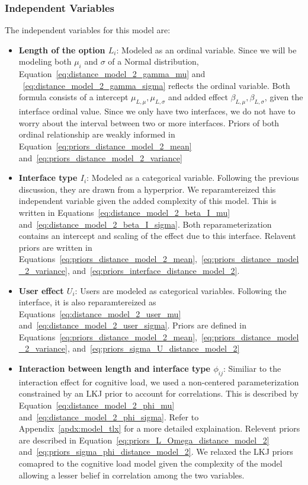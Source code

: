 \subsubsection{Independent Variables}
The independent variables for this model are:
\begin{itemize}
    \item \textbf{Length of the option $L_i$}: Modeled as an ordinal variable. Since we will be modeling both $\mu_i$ and $\sigma$ of a Normal distribution, Equation~\ref{eq:distance_model_2_gamma_mu} and ~\ref{eq:distance_model_2_gamma_sigma} reflects the ordinal variable. Both formula consists of a intercept $\mu_{L,\mu}, \mu_{L,\sigma}$ and added effect $\beta_{L,\mu}, \beta_{L,\sigma}$, given the interface ordinal value. Since we only have two interfaces, we do not have to worry about the interval between two or more interfaces. Priors of both ordinal relationship are weakly informed in Equation~\ref{eq:priors_distance_model_2_mean} and~\ref{eq:priors_distance_model_2_variance}
    \item \textbf{Interface type $I_i$}: Modeled as a categorical variable. Following the previous discussion, they are drawn from a hyperprior. We reparamtereized this independent variable given the added complexity of this model. This is written in Equations~\ref{eq:distance_model_2_beta_I_mu} and~\ref{eq:distance_model_2_beta_I_sigma}. Both reparameterization contains an intercept and scaling of the effect due to this interface. Relavent priors are written in Equations~\ref{eq:priors_distance_model_2_mean},~\ref{eq:priors_distance_model_2_variance}, and~\ref{eq:priors_interface_distance_model_2}.
    \item \textbf{User effect $U_i$}: Users are modeled as categorical variables. Following the interface, it is also reparamtereized as Equations~\ref{eq:distance_model_2_user_mu} and~\ref{eq:distance_model_2_user_sigma}. Priors are defined in Equations~\ref{eq:priors_distance_model_2_mean},~\ref{eq:priors_distance_model_2_variance}, and~\ref{eq:priors_sigma_U_distance_model_2}
    \item \textbf{Interaction between length and interface type $\phi_{ij}$}: Similiar to the interaction effect for cognitive load, we used a non-centered parameterization constrained by an LKJ prior to account for correlations. This is described by Equation~\ref{eq:distance_model_2_phi_mu} and~\ref{eq:distance_model_2_phi_sigma}. Refer to Appendix~\ref{apdx:model_tlx} for a more detailed explaination. Relevent priors are described in Equation~\ref{eq:priors_L_Omega_distance_model_2} and~\ref{eq:priors_sigma_phi_distance_model_2}. We relaxed the LKJ priors comapred to the cognitive load model given the complexity of the model allowing a lesser belief in correlation among the two variables.
\end{itemize}

